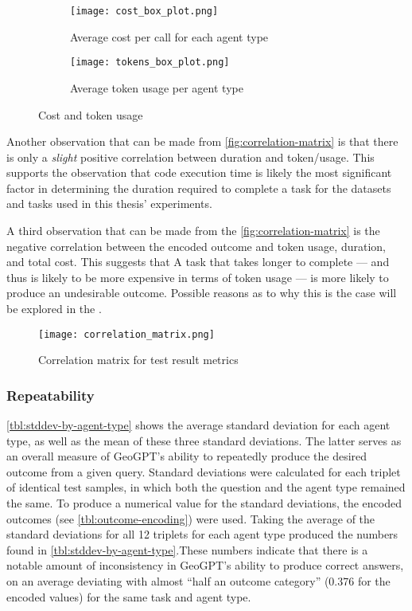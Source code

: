 \begin{figure}[htbp]
    \centering
    \begin{subfigure}[b]{0.48\textwidth}
        \centering
        \texttt{[image: cost\_box\_plot.png]}
        \caption{Average cost per call for each agent type}
        \label{fig:cost-box-plot}
    \end{subfigure}
    \hfill
    \begin{subfigure}[b]{0.48\textwidth}
        \centering
        \texttt{[image: tokens\_box\_plot.png]}
        \caption{Average token usage per agent type}
        \label{fig:tokens-box-plot}
    \end{subfigure}
    \caption{Cost and token usage}
    \label{fig:cost-and-tokens}
\end{figure}

Another observation that can be made from \autoref{fig:correlation-matrix} is that there is only a \textit{slight} positive correlation between duration and token/usage. This supports the observation that code execution time is likely the most significant factor in determining the duration required to complete a task for the datasets and tasks used in this thesis' experiments.

A third observation that can be made from the \autoref{fig:correlation-matrix} is the negative correlation between the encoded outcome and token usage, duration, and total cost. This suggests that A task that takes longer to complete --- and thus is likely to be more expensive in terms of token usage --- is more likely to produce an undesirable outcome. Possible reasons as to why this is the case will be explored in the .

\begin{figure}[htbp]
    \centering
    \texttt{[image: correlation\_matrix.png]}
    \caption{Correlation matrix for test result metrics}
    \label{fig:correlation-matrix}
\end{figure}

\subsubsection{Repeatability}

\autoref{tbl:stddev-by-agent-type} shows the average standard deviation for each agent type, as well as the mean of these three standard deviations. The latter serves as an overall measure of GeoGPT's ability to repeatedly produce the desired outcome from a given query. Standard deviations were calculated for each triplet of identical test samples, in which both the question and the agent type remained the same. To produce a numerical value for the standard deviations, the encoded outcomes (see \autoref{tbl:outcome-encoding}) were used. Taking the average of the standard deviations for all 12 triplets for each agent type produced the numbers found in \autoref{tbl:stddev-by-agent-type}.These numbers indicate that there is a notable amount of inconsistency in GeoGPT's ability to produce correct answers, on an average deviating with almost \enquote{half an outcome category} (0.376 for the encoded values) for the same task and agent type.

